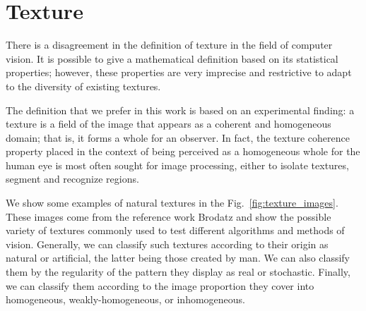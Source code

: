 \section{Texture}
There is a disagreement in the definition of texture in the field of computer vision. It is possible to give a mathematical definition based on its statistical properties; however, these properties are very imprecise and restrictive to adapt to the diversity of existing textures.

The definition that we prefer in this work is based on an experimental finding: a texture is a field of the image that appears as a coherent and homogeneous domain; that is, it forms a whole for an observer. In fact, the texture coherence property placed in the context of being perceived as a homogeneous whole for the human eye is most often sought for image processing, either to isolate textures, segment and recognize regions.

We show some examples of natural textures in the Fig.\ \ref{fig:texture_images}. These images come from the reference work Brodatz and show the possible variety of textures commonly used to test different algorithms and methods of vision. Generally, we can classify such textures according to their origin as natural or artificial, the latter being those created by man. We can also classify them by the regularity of the pattern they display as real or stochastic. Finally, we can classify them according to the image proportion they cover into homogeneous, weakly-homogeneous, or inhomogeneous.


